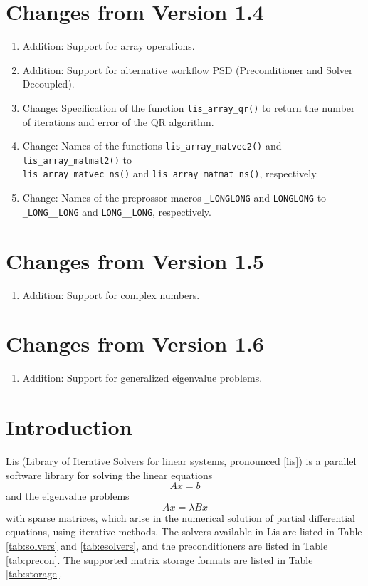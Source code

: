 \documentclass[a4paper]{article}
\begin{document}
\section*{Changes from Version 1.4}
\begin{enumerate}
\item Addition: Support for array operations.
\item Addition: Support for alternative workflow PSD (Preconditioner and Solver
      Decoupled). 
\item Change: Specification of the function 
      {\tt lis\_array\_qr()} to return 
      the number of iterations and error of the QR algorithm. 
\item Change: Names of the functions
      {\tt lis\_array\_matvec2()} and {\tt lis\_array\_matmat2()} to \\
      {\tt lis\_array\_matvec\_ns()} and {\tt lis\_array\_matmat\_ns()}, respectively.
\item Change: Names of the preprossor macros {\tt \_LONGLONG} and 
      {\tt LONGLONG} to {\tt \_LONG\_\_LONG} and {\tt LONG\_\_LONG}, respectively.
\end{enumerate}

\section*{Changes from Version 1.5}
\begin{enumerate}
\item Addition: Support for complex numbers.
\end{enumerate}
  
\section*{Changes from Version 1.6}
\begin{enumerate}
\item Addition: Support for generalized eigenvalue problems.
\end{enumerate}
  
\newpage
\section{Introduction}
Lis (Library of Iterative Solvers for linear systems, pronounced [lis])
is a parallel software library for solving the linear equations
\[
 Ax = b
\]
and the eigenvalue problems
\[
 Ax = \lambda Bx
\]
with sparse matrices, which arise in the numerical solution of
partial differential equations, using iterative methods\cite{nishida}.
The solvers available in Lis are listed in Table \ref{tab:solvers} and
\ref{tab:esolvers}, and the preconditioners are listed in Table \ref{tab:precon}.
The supported matrix storage formats are listed in Table \ref{tab:storage}.
\end{document}
